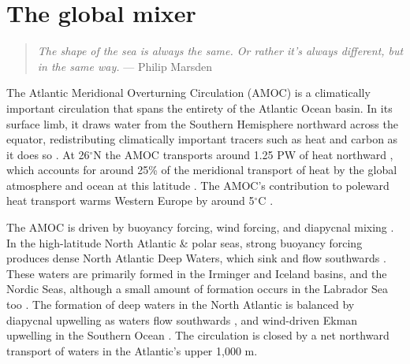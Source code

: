 \chapter{The global mixer}
\label{chap:1}

\begin{quote}
\textit{The shape of the sea is always the same. Or rather it's always different, but in the same way.} --- Philip Marsden
\end{quote}

The Atlantic Meridional Overturning Circulation (AMOC) is a climatically important circulation that spans the entirety of the Atlantic Ocean basin. In its surface limb, it draws water from the Southern Hemisphere northward across the equator, redistributing climatically important tracers such as heat and carbon as it does so \citep{Buckley2015}. At 26$^\circ$N the AMOC transports around 1.25 PW of heat northward \citep{Bryden2020}, which accounts for around 25\% of the meridional transport of heat by the global atmosphere and ocean at this latitude \citep{Srokosz2012}. The AMOC's contribution to poleward heat transport warms Western Europe by around 5$^\circ$C \citep{Jackson2015}.

The AMOC is driven by buoyancy forcing, wind forcing, and diapycnal mixing \citep[e.g.][]{Johnson2019, Munk1998}.
In the high-latitude North Atlantic \& polar seas, strong buoyancy forcing produces dense North Atlantic Deep Waters, which sink and flow southwards \citep[e.g.][]{Marshall1999}. These waters are primarily formed in the Irminger and Iceland basins, and the Nordic Seas, although a small amount of formation occurs in the Labrador Sea too \citep{Lozier2019}. The formation of deep waters in the North Atlantic is balanced by diapycnal upwelling as waters flow southwards \citep{Cimoli2022, Ferrari2016, Mashayek2017, McDougall2017, Callies2018}, and wind-driven Ekman upwelling in the Southern Ocean \citep{Gnanadesikan1999, Marshall2012}. The circulation is closed by a net northward transport of waters in the Atlantic's upper 1,000 m.


